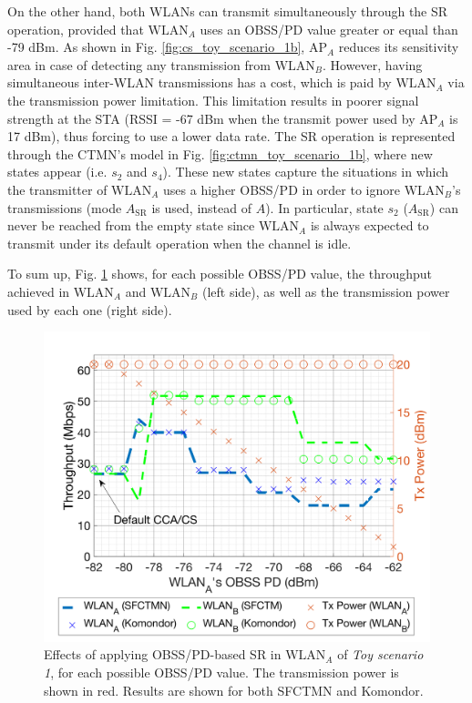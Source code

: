 \documentclass[preprint,12pt]{elsarticle}
\begin{document}
	On the other hand, both WLANs can transmit simultaneously through the SR operation, provided that $\text{WLAN}_A$ uses an OBSS/PD value greater or equal than -79 dBm. As shown in Fig. \ref{fig:cs_toy_scenario_1b}, $\text{AP}_A$ reduces its sensitivity area in case of detecting any transmission from $\text{WLAN}_B$. However, having simultaneous inter-WLAN transmissions has a cost, which is paid by $\text{WLAN}_A$ via the transmission power limitation. This limitation results in poorer signal strength at the STA (RSSI = -67 dBm when the transmit power used by AP$_A$ is 17 dBm), thus forcing to use a lower data rate. The SR operation is represented through the CTMN's model in Fig. \ref{fig:ctmn_toy_scenario_1b}, where new states appear (i.e. $s_2$ and $s_4$). These new states capture the situations in which the transmitter of $\text{WLAN}_A$ uses a higher OBSS/PD in order to ignore $\text{WLAN}_B$'s transmissions (mode $A_\text{SR}$ is used, instead of $A$). In particular, state $s_2$ ($A_\text{SR}$) can never be reached from the empty state since $\text{WLAN}_A$ is always expected to transmit under its default operation when the channel is idle.
	
	To sum up, Fig. \ref{fig:toy_scenario_1_results} shows, for each possible OBSS/PD value, the throughput achieved in $\text{WLAN}_A$ and $\text{WLAN}_B$ (left side), as well as the transmission power used by each one (right side).  
	\begin{figure}[ht!]
		\centering
		\includegraphics[width=0.5\columnwidth]{SIM_1_1}
		\caption{Effects of applying OBSS/PD-based SR in $\text{WLAN}_A$ of \emph{Toy scenario 1}, for each possible OBSS/PD value. The transmission power is shown in red. Results are shown for both SFCTMN and Komondor.}		\label{fig:toy_scenario_1_results}
	\end{figure}
	
\end{document}

